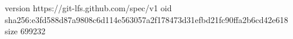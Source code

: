 version https://git-lfs.github.com/spec/v1
oid sha256:e3fd588d87a9808c6d114e563057a2f178473d31efbd21fc90ffa2b6cd42e618
size 699232
